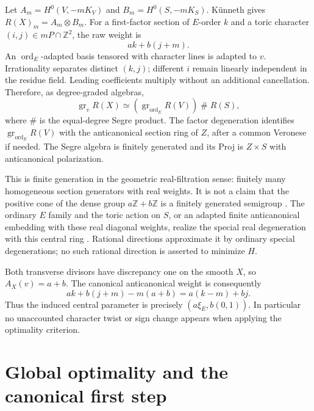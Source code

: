 \documentclass[11pt,a4paper]{article}
\newcommand{\Z}{\mathbb Z}
\newcommand{\ord}{\operatorname{ord}}
\newcommand{\gr}{\operatorname{gr}}
\begin{document}
Let \(A_m=H^0(V,-mK_V)\) and \(B_m=H^0(S,-mK_S)\).
Künneth gives \(R(X)_m=A_m\otimes B_m\).
For a first-factor section of \(E\)-order \(k\) and a toric
character \((i,j)\in mP\cap\Z^2\), the raw weight is
\[
                  ak+b(j+m).
\]
An \(\ord_E\)-adapted basis tensored with character lines is
adapted to \(v\). Irrationality separates distinct \((k,j)\);
different \(i\) remain linearly independent in the residue field.
Leading coefficients multiply without an additional cancellation.
Therefore, as degree-graded algebras,
\[
       \gr_v R(X)\simeq(\gr_{\ord_E}R(V))\mathbin{\#}R(S),
\]
where \(\#\) is the equal-degree Segre product.
The factor degeneration identifies \(\gr_{\ord_E}R(V)\) with the
anticanonical section ring of \(Z\), after a common Veronese if needed.
The Segre algebra is finitely generated and its Proj is \(Z\times S\)
with anticanonical polarization.

This is finite generation in the geometric real-filtration sense:
finitely many homogeneous section generators with real weights.
It is not a claim that the positive cone of the dense group
\(a\Z+b\Z\) is a finitely generated semigroup
\cite[Definition~2.2]{BLXZ}.
The ordinary \(E\) family and the toric action on \(S\), or an
adapted finite anticanonical embedding with these real diagonal
weights, realize the special real degeneration with this central ring
\cite[\S2.2, Geometric R-TC I]{HL}.
Rational directions approximate it by ordinary special degenerations;
no such rational direction is asserted to minimize \(H\).

Both transverse divisors have discrepancy one on the smooth \(X\),
so \(A_X(v)=a+b\). The canonical anticanonical weight is consequently
\[
           ak+b(j+m)-m(a+b)=a(k-m)+bj.                 \tag{*}
\]
Thus the induced central parameter is precisely
\((a\xi_E,b(0,1))\). In particular no unaccounted character twist
or sign change appears when applying the optimality criterion.

\section{Global optimality and the canonical first step}
\end{document}
